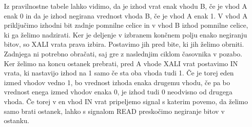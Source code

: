 \documentclass[12pt]{article}
\begin{document}
        Iz pravilnostne tabele lahko vidimo, da je izhod vrat enak vhodu B, če
        je vhod A enak 0 in da je izhod negirana vrednost vhoda B, če je vhod A
        enak 1. V vhod A priključimo izhodni bit zadnje pomnilne celice in v
        vhod B izhod pomnilne celice, ki ga želimo nadzirati. Ker je deljenje v
        izbranem končnem polju enako negiranju bitov, so XALI vrata prava izbira.
        Postavimo jih pred bite, ki jih želimo obrniti. Zadnjega ni potrebno
        obračati, saj gre z naslednjim ciklom časovnika v pozabo.
        Ker želimo na koncu ostanek prebrati, pred A vhode XALI vrat postavimo
        IN vrata, ki nastavijo izhod na 1 samo če sta oba vhoda tudi 1. Če je
        torej eden izmed vhodov vedno 1, bo vrednost izhoda enaka drugemu vhodu,
        če pa bo vrednost enega izmed vhodov enaka 0, je izhod tudi 0 neodvisno
        od drugega vhoda. Če torej v en vhod IN vrat pripeljemo signal s katerim
        povemo, da želimo samo brati ostanek, lahko s signalom READ preskočimo
        negiranje bitov v ostanku.

    \newpage
\end{document}
